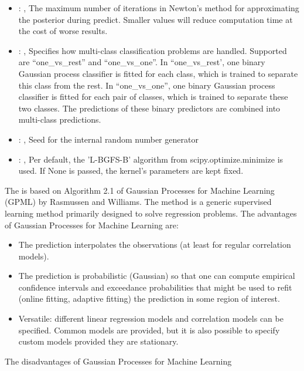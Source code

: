 \begin{itemize}
    \item {}: , 
      The maximum number of iterations in Newton’s method for approximating the posterior during
      predict. Smaller values will reduce computation time at
      the cost of worse results.

    \item {}: , 
      Specifies how multi-class classification problems are handled. Supported are ``one\_vs\_rest''
      and ``one\_vs\_one''.                                                         In
      ``one\_vs\_rest', one binary Gaussian process classifier is fitted for each class, which is
      trained to separate this class                                                         from
      the rest. In ``one\_vs\_one'', one binary Gaussian process classifier is fitted for each pair
      of classes, which is trained to
      separate these two classes. The predictions of these binary predictors are combined into
      multi-class predictions.

    \item {}: , 
      Seed for the internal random number generator

    \item {}: , 
      Per default, the 'L-BGFS-B' algorithm from
      scipy.optimize.minimize is used. If None is passed, the kernel’s
      parameters are kept fixed.
  \end{itemize}
 The  is based on Algorithm 2.1 of Gaussian Processes
 for Machine Learning (GPML) by Rasmussen and Williams. The method is a generic supervised learning
 method primarily designed to solve regression problems.                          The advantages of
 Gaussian Processes for Machine Learning are:                          \begin{itemize}
 \item The prediction interpolates the observations (at least for regular
 correlation models).                            \item The prediction is probabilistic (Gaussian) so
 that one can compute                            empirical confidence intervals and exceedance
 probabilities that might be used                            to refit (online fitting, adaptive
 fitting) the prediction in some region of                            interest.
 \item Versatile: different linear regression models and correlation models can
 be specified.                            Common models are provided, but it is also possible to
 specify custom models                            provided they are stationary.
 \end{itemize}                          The disadvantages of Gaussian Processes for Machine Learning
